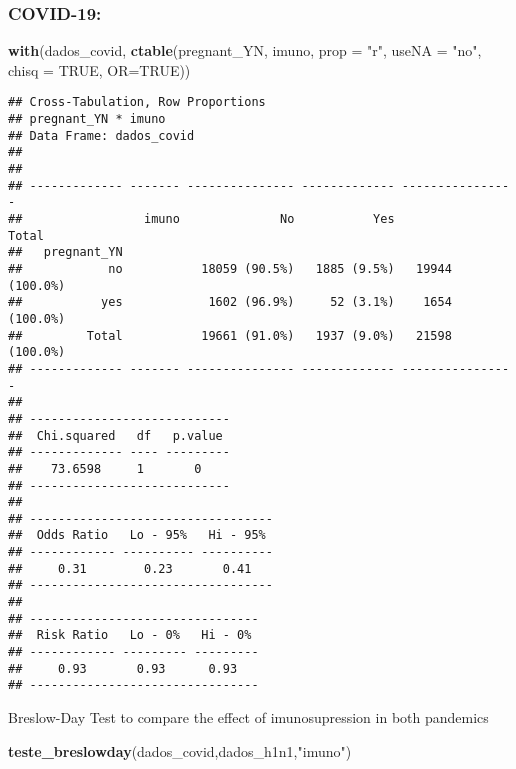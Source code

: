 \documentclass[
]{article}
\newenvironment{Shaded}{\begin{snugshade}}{\end{snugshade}}
\newcommand{\DataTypeTok}[1]{\textcolor[rgb]{0.13,0.29,0.53}{#1}}
\newcommand{\KeywordTok}[1]{\textcolor[rgb]{0.13,0.29,0.53}{\textbf{#1}}}
\newcommand{\NormalTok}[1]{#1}
\newcommand{\OtherTok}[1]{\textcolor[rgb]{0.56,0.35,0.01}{#1}}
\newcommand{\StringTok}[1]{\textcolor[rgb]{0.31,0.60,0.02}{#1}}
\begin{document}
\hypertarget{covid-19-8}{%
\subsubsection{COVID-19:}\label{covid-19-8}}

\begin{Shaded}
\begin{Highlighting}[]
\KeywordTok{with}\NormalTok{(dados_covid, }\KeywordTok{ctable}\NormalTok{(pregnant_YN, imuno, }\DataTypeTok{prop =} \StringTok{"r"}\NormalTok{, }\DataTypeTok{useNA =} \StringTok{"no"}\NormalTok{, }\DataTypeTok{chisq =} \OtherTok{TRUE}\NormalTok{, }\DataTypeTok{OR=}\OtherTok{TRUE}\NormalTok{))}
\end{Highlighting}
\end{Shaded}

\begin{verbatim}
## Cross-Tabulation, Row Proportions  
## pregnant_YN * imuno  
## Data Frame: dados_covid  
## 
## 
## ------------- ------- --------------- ------------- ----------------
##                 imuno              No           Yes            Total
##   pregnant_YN                                                       
##            no           18059 (90.5%)   1885 (9.5%)   19944 (100.0%)
##           yes            1602 (96.9%)     52 (3.1%)    1654 (100.0%)
##         Total           19661 (91.0%)   1937 (9.0%)   21598 (100.0%)
## ------------- ------- --------------- ------------- ----------------
## 
## ----------------------------
##  Chi.squared   df   p.value 
## ------------- ---- ---------
##    73.6598     1       0    
## ----------------------------
## 
## ----------------------------------
##  Odds Ratio   Lo - 95%   Hi - 95% 
## ------------ ---------- ----------
##     0.31        0.23       0.41   
## ----------------------------------
## 
## --------------------------------
##  Risk Ratio   Lo - 0%   Hi - 0% 
## ------------ --------- ---------
##     0.93       0.93      0.93   
## --------------------------------
\end{verbatim}

Breslow-Day Test to compare the effect of imunosupression in both
pandemics

\begin{Shaded}
\begin{Highlighting}[]
\KeywordTok{teste_breslowday}\NormalTok{(dados_covid,dados_h1n1,}\StringTok{"imuno"}\NormalTok{)}
\end{Highlighting}
\end{Shaded}
\end{document}
